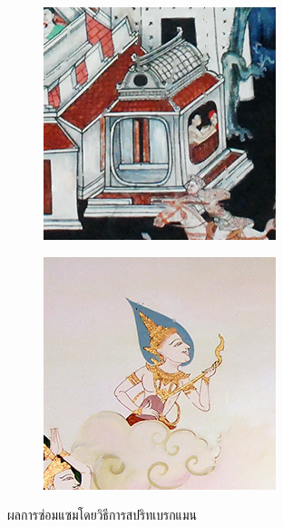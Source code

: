 \documentclass[hidelinks, a4paper,12pt]{article}
\numberwithin{equation}{section}							%
\numberwithin{equation}{section}
\begin{document}
{\begin{figure}[H]
\begin{subfigure}{0.4\linewidth}
			\includegraphics[width=0.8\linewidth]{images/result_ex4/splitbergman_case04.png}			
		\end{subfigure}
		\begin{subfigure}{0.4\linewidth}
			\centering
			\includegraphics[width=0.8\linewidth]{images/result_ex4/splitbergman_case05.png}			
		\end{subfigure}
		\caption{ผลการซ่อมแซมโดยวิธีการสปริทเบรกแมน}
	\end{figure}
	\begin{table}[H]
		\centering
		\begin{tabular}[ht]{|c|c|c|c|c|}

\end{tabular}
\end{table}}
\end{document}
